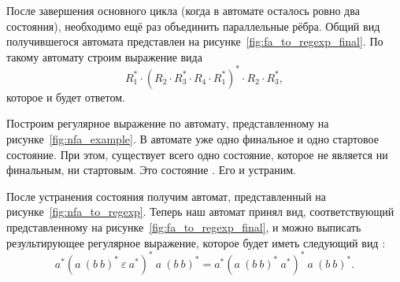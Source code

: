 После завершения основного цикла (когда в автомате осталось ровно два состояния), необходимо ещё раз объединить параллельные рёбра.
Общий вид получившегося автомата представлен на рисунке~\ref{fig:fa_to_regexp_final}.
По такому автомату строим выражение вида \[R_1^* \cdot (R_2 \cdot R_3^* \cdot R_4 \cdot R_1^*)^* \cdot R_2 \cdot R_3^*,\] которое и будет ответом.
\begin{marginfigure}

    \begin{center}
        

    \end{center}

    \caption{Общий вид автомата после завершения основного цикла исключения вершин при построении по нему регулярного выражения}
    \label{fig:fa_to_regexp_final}

\end{marginfigure}

\begin{example}
    Построим регулярное выражение по автомату, представленному на рисунке~\ref{fig:nfa_example}.
    В автомате уже одно финальное и одно стартовое состояние.
    При этом, существует всего одно состояние, которое не является ни финальным, ни стартовым.
    Это состояние .
    Его и устраним.

    После устранения состояния  получим автомат, представленный на рисунке~\ref{fig:nfa_to_regexp}.
    Теперь наш автомат принял вид, соответствующий представленному на рисунке~\ref{fig:fa_to_regexp_final}, и можно выписать результирующее регулярное выражение, которое будет иметь следующий вид%
    :
    \[
    a^*(a \ (b \ b)^* \ \varepsilon \ a^*)^* \ a \ (b \ b)^* =
    a^*(a \ (b \ b)^* \ a^*)^* \ a \ (b \ b)^*.
    \]

    \begin{marginfigure}
        \begin{center}
            
        \end{center}
        \caption{Пример построения регулярного выражения по конечному автомату: финальное состояние автомата}
        \label{fig:nfa_to_regexp}
    \end{marginfigure}

\end{example}
